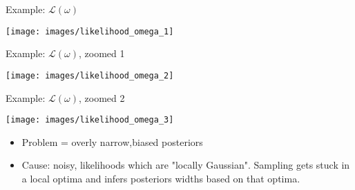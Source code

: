 \documentclass[10pt]{beamer}
\begin{document}
\begin{frame}{}
	
	Example: $\mathcal{L}(\omega)$
	
	\texttt{[image: images/likelihood\_omega\_1]}

	
\end{frame}


\begin{frame}{}
	
	Example: $\mathcal{L}(\omega)$, zoomed 1
	
	\texttt{[image: images/likelihood\_omega\_2]}
	
	
\end{frame}


\begin{frame}{}
	
	Example: $\mathcal{L}(\omega)$, zoomed 2
	
	\texttt{[image: images/likelihood\_omega\_3]}
	
	
\end{frame}






\begin{frame}{}
	
		\begin{itemize}
		\item \alert{Problem} = overly narrow,biased posteriors
		\item Cause: noisy, likelihoods which are "locally Gaussian". Sampling gets stuck in a local optima and infers posteriors widths based on that optima. 
%
	\end{itemize}
	
	
	
\end{frame}
\end{document}

